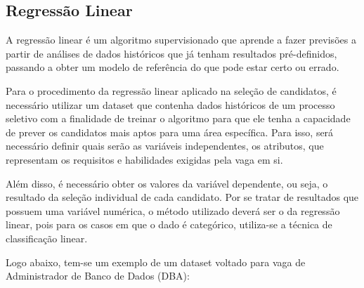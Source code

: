 \documentclass[conference]{IEEEtran}
\begin{document}
\subsection{Regressão Linear}
A regressão linear é um algoritmo supervisionado que aprende a fazer previsões a partir de análises de dados históricos que já tenham resultados pré-definidos, passando a obter um modelo de referência do que pode estar certo ou errado. 

Para o procedimento da regressão linear aplicado na seleção de candidatos, é necessário utilizar um dataset que contenha dados históricos de um processo seletivo com a finalidade de treinar o algoritmo para que ele tenha a capacidade de prever os candidatos mais aptos para uma área específica. Para isso, será necessário definir quais serão as variáveis independentes, os atributos, que representam os requisitos e habilidades exigidas pela vaga em si.

Além disso, é necessário obter os valores da variável dependente, ou seja, o resultado da seleção individual de cada candidato. Por se tratar de resultados que possuem uma variável numérica, o método utilizado deverá ser o da regressão linear, pois para os casos em que o dado é categórico, utiliza-se a técnica de classificação linear.

Logo abaixo, tem-se um exemplo de um dataset voltado para vaga de Administrador de Banco de Dados (DBA):
\end{document}
